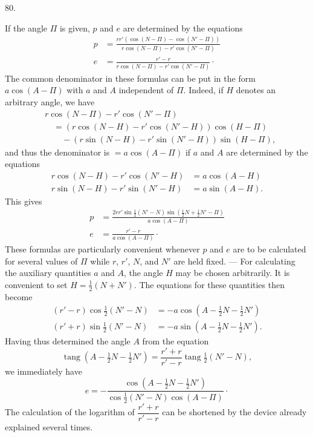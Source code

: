 \medskip
\hypertarget{native-109-article080}{}
\begin{center}80.\end{center}
If the angle $\Pi$ is given, $p$ and $e$ are determined by the equations
\[
\begin{aligned}
p&=\frac{rr'(\cos(N-\Pi)-\cos(N'-\Pi))}{r\cos(N-\Pi)-r'\cos(N'-\Pi)}\\[4pt]
e&=\frac{r'-r}{r\cos(N-\Pi)-r'\cos(N'-\Pi)}\mathpunct{\cdot}
\end{aligned}
\]
The common denominator in these formulas can be put in the form $a\cos(A-\Pi)$ with $a$ and $A$ independent of $\Pi$. Indeed, if $H$ denotes an arbitrary angle, we have
\[
\begin{aligned}
&r\cos(N-\Pi)-r'\cos(N'-\Pi)\\
&\quad=(r\cos(N-H)-r'\cos(N'-H))\cos(H-\Pi)\\
&\qquad-(r\sin(N-H)-r'\sin(N'-H))\sin(H-\Pi),
\end{aligned}
\]
and thus the denominator is $=a\cos(A-\Pi)$ if $a$ and $A$ are determined by the equations
\[
\begin{aligned}
r\cos(N-H)-r'\cos(N'-H)&=a\cos(A-H)\\
r\sin(N-H)-r'\sin(N'-H)&=a\sin(A-H).
\end{aligned}
\]
This gives
\[
\begin{aligned}
p&=\frac{2rr'\sin\tfrac12(N'-N)\sin(\tfrac12N+\tfrac12N'-\Pi)}{a\cos(A-\Pi)}\\[4pt]
e&=\frac{r'-r}{a\cos(A-\Pi)}\mathpunct{\cdot}
\end{aligned}
\]
These formulas are particularly convenient whenever $p$ and $e$ are to be calculated for several values of $\Pi$ while $r$, $r'$, $N$, and $N'$ are held fixed. — For calculating the auxiliary quantities $a$ and $A$, the angle $H$ may be chosen arbitrarily. It is convenient to set $H=\tfrac12(N+N')$. The equations for these quantities then become
\[
\begin{aligned}
(r'-r)\cos\tfrac12(N'-N)&=-a\cos(A-\tfrac12N-\tfrac12N')\\
(r'+r)\sin\tfrac12(N'-N)&=-a\sin(A-\tfrac12N-\tfrac12N').
\end{aligned}
\]
Having thus determined the angle $A$ from the equation
\[
\operatorname{tang}(A-\tfrac12N-\tfrac12N')=\frac{r'+r}{r'-r}\operatorname{tang}\tfrac12(N'-N),
\]
we immediately have
\[
e=-\frac{\cos(A-\tfrac12N-\tfrac12N')}{\cos\tfrac12(N'-N)\cos(A-\Pi)}\mathpunct{\cdot}
\]
The calculation of the logarithm of $\dfrac{r'+r}{r'-r}$ can be shortened by the device already explained several times.
